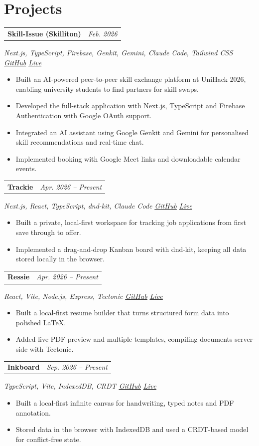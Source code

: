 \documentclass[10pt,a4paper]{article}
\makeatletter
\let\oldhref\href
\renewcommand{\href}[2]{\oldhref{#1}{\underline{#2}}}
\newcommand{\resumeProject}[3]{%
  \begin{tabularx}{\textwidth}{@{}Xr@{}}
    \textbf{#1} & \textit{#2}
  \end{tabularx}
  \textit{\color{muted}#3}
  \vspace{-1pt}
}
\makeatother
\begin{document}
\section{Projects}
\resumeProject{Skill-Issue (Skilliton)}{Feb. 2026}{Next.js, TypeScript, Firebase, Genkit, Gemini, Claude Code, Tailwind CSS \textbar{} \href{https://github.com/pjrus/unihack-2026-final}{GitHub} \textbar{} \href{https://studio--studio-818276670-ce8c7.us-central1.hosted.app}{Live}}
\begin{itemize}
  \item Built an AI-powered peer-to-peer skill exchange platform at UniHack 2026, enabling university students to find partners for skill swaps.
  \item Developed the full-stack application with Next.js, TypeScript and Firebase Authentication with Google OAuth support.
  \item Integrated an AI assistant using Google Genkit and Gemini for personalised skill recommendations and real-time chat.
  \item Implemented booking with Google Meet links and downloadable calendar events.
\end{itemize}

\resumeProject{Trackie}{Apr. 2026 -- Present}{Next.js, React, TypeScript, dnd-kit, Claude Code \textbar{} \href{https://github.com/pjrus/trackie}{GitHub} \textbar{} \href{https://pjrus.github.io/trackie/kanban/}{Live}}
\begin{itemize}
  \item Built a private, local-first workspace for tracking job applications from first save through to offer.
  \item Implemented a drag-and-drop Kanban board with dnd-kit, keeping all data stored locally in the browser.
\end{itemize}

\resumeProject{Ressie}{Apr. 2026 -- Present}{React, Vite, Node.js, Express, Tectonic \textbar{} \href{https://github.com/pjrus/ressie}{GitHub} \textbar{} \href{https://ressie.onrender.com/}{Live}}
\begin{itemize}
  \item Built a local-first resume builder that turns structured form data into polished LaTeX.
  \item Added live PDF preview and multiple templates, compiling documents server-side with Tectonic.
\end{itemize}

\resumeProject{Inkboard}{Sep. 2026 -- Present}{TypeScript, Vite, IndexedDB, CRDT \textbar{} \href{https://github.com/pjrus/inkboard}{GitHub} \textbar{} \href{https://pjrus.github.io/inkboard/}{Live}}
\begin{itemize}
  \item Built a local-first infinite canvas for handwriting, typed notes and PDF annotation.
  \item Stored data in the browser with IndexedDB and used a CRDT-based model for conflict-free state.
\end{itemize}
\end{document}
